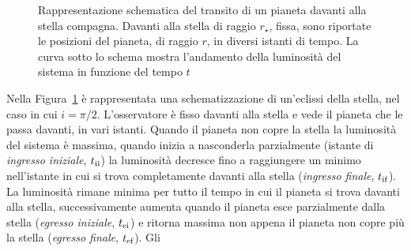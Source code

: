 \begin{figure}
  \centering
  \caption[Rappresentazione schematica del transito di un pianeta davanti alla
  stella
  compagna]{Rappresentazione schematica del transito di un pianeta davanti alla
    stella compagna. Davanti alla stella di raggio $r_\star$, fissa, sono
    riportate le posizioni del pianeta, di raggio $r$, in diversi istanti di
    tempo. La curva sotto lo schema mostra l'andamento della luminosità del
    sistema in funzione del tempo $t$}
  \label{fig:schema-transito}
\end{figure}
Nella Figura~\ref{fig:schema-transito} %
è rappresentata una schematizzazione di un'eclissi della stella, nel caso in cui
$i = \pi/2$. L'osservatore è fisso davanti alla stella e vede il pianeta che le
passa davanti, in vari istanti. Quando il pianeta non copre la stella la
luminosità del sistema è massima, quando inizia a nasconderla parzialmente
(istante di \emph{ingresso iniziale}, $t_{\textup{ii}}$) la luminosità decresce
fino a raggiungere un minimo nell'istante in cui si trova completamente davanti
alla stella (\emph{ingresso finale}, $t_{\textup{if}}$). La luminosità rimane
minima per tutto il tempo in cui il pianeta si trova davanti alla stella,
successivamente aumenta quando il pianeta esce parzialmente dalla stella
(\emph{egresso iniziale}, $t_{\textup{ei}}$) e ritorna massima non appena il
pianeta non copre più la stella (\emph{egresso finale}, $t_{\textup{ef}}$). Gli

